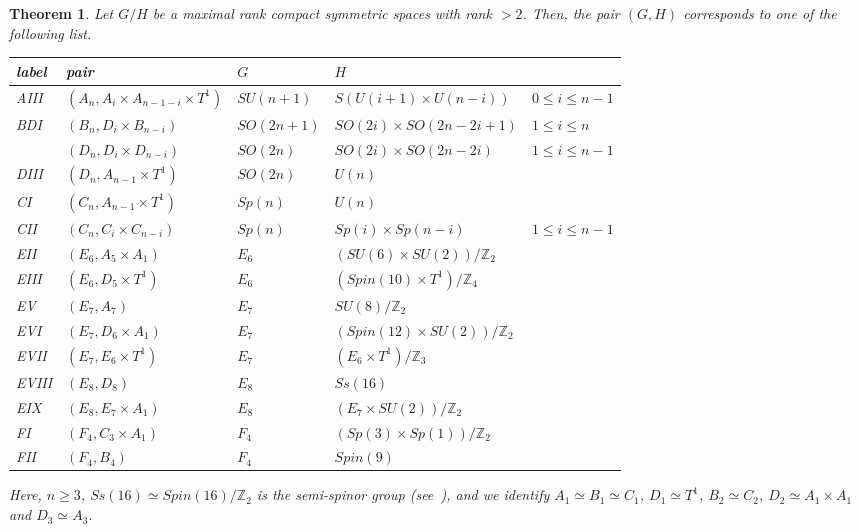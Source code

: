 \documentclass{amsart}
\newtheorem{theorem}{Theorem}[section]
\theoremstyle{definition}
\theoremstyle{remark}
\numberwithin{equation}{section}
\begin{document}
\begin{theorem}
\label{thm:cart}
Let $G/H$ be a maximal rank compact symmetric spaces with rank $>2$.
Then, the pair $(G,H)$ corresponds to one of the following list.
\begin{center}
\begin{tabular}{|l|l|l|l|l|} \hline
   label & pair & $G$ & $H$ &  \\ \hline
   {\rm AIII} & $(A_{n},A_{i}\times A_{n-1-i}\times T^{1})$ & $SU(n+1)$ & $S(U(i+1)\times U(n-i))$ & $0\le i\le n-1$ \\
   {\rm BDI} & $(B_{n}, D_{i}\times B_{n-i})$ & $SO(2n+1)$ & $SO(2i)\times SO(2n-2i+1)$ &  $1\le i\le n$ \\ 
    & $(D_{n}, D_{i}\times D_{n-i})$ & $SO(2n)$ & $SO(2i)\times SO(2n-2i)$ &  $1\le i\le n-1$  \\
    {\rm DIII} & $(D_{n}, A_{n-1}\times T^{1})$ & $SO(2n)$ & $U(n)$ & \\
    {\rm CI} & $(C_{n}, A_{n-1}\times T^{1})$ & $Sp(n)$ & $U(n)$ &  \\
    {\rm CII} & $(C_{n},C_{i}\times C_{n-i})$ & $Sp(n)$ & $Sp(i)\times Sp(n-i)$ & $1\le i\le n-1$ \\ 
    {\rm EII} & $(E_{6}, A_{5}\times A_{1})$ & $E_{6}$ & $(SU(6)\times SU(2))/\mathbb{Z}_{2}$ & \\
    {\rm EIII} & $(E_{6}, D_{5}\times T^{1})$ & $E_{6}$ & $(Spin(10)\times T^{1})/\mathbb{Z}_{4}$ & \\
    {\rm EV} & $(E_{7},A_{7})$ & $E_{7}$ & $SU(8)/\mathbb{Z}_{2}$ & \\
    {\rm EVI} & $(E_{7},D_{6}\times A_{1})$ & $E_{7}$ & $(Spin(12)\times SU(2))/\mathbb{Z}_{2}$ & \\
    {\rm EVII} & $(E_{7},E_{6}\times T^{1})$ & $E_{7}$ & $(E_{6}\times T^{1})/\mathbb{Z}_{3}$ & \\
    {\rm EVIII} & $(E_{8},D_{8})$ & $E_{8}$ & $Ss(16)$ & \\
    {\rm EIX} & $(E_{8},E_{7}\times A_{1})$ & $E_{8}$ & $(E_{7}\times SU(2))/\mathbb{Z}_{2}$ & \\
   {\rm FI} & $(F_{4}, C_{3}\times A_{1})$ & $F_{4}$ & $(Sp(3)\times Sp(1))/\mathbb{Z}_{2}$ & \\
   {\rm FII} & $(F_{4}, B_{4})$ & $F_{4}$ & $Spin(9)$ & \\
   \hline
 \end{tabular}
\end{center}
 
Here, $n\ge 3$, $Ss(16)\simeq Spin(16)/\mathbb{Z}_{2}$ is the semi-spinor group (see~\cite[Theorem 2.1]{IT}), and we identify $A_{1}\simeq B_{1}\simeq C_{1}$, $D_{1}\simeq T^{1}$, $B_{2}\simeq C_{2}$, $D_{2}\simeq A_{1}\times A_{1}$ and $D_{3}\simeq A_{3}$.
\end{theorem}
\end{document}
